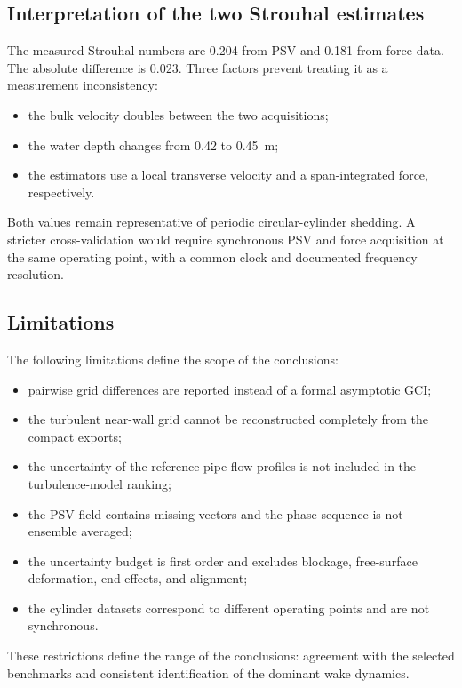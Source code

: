 \subsection{Interpretation of the two Strouhal estimates}

The measured Strouhal numbers are 0.204 from PSV and 0.181 from force data. The absolute difference is 0.023. Three factors prevent treating it as a measurement inconsistency:
\begin{itemize}
    \item the bulk velocity doubles between the two acquisitions;
    \item the water depth changes from 0.42 to 0.45~m;
    \item the estimators use a local transverse velocity and a span-integrated force, respectively.
\end{itemize}
Both values remain representative of periodic circular-cylinder shedding. A stricter cross-validation would require synchronous PSV and force acquisition at the same operating point, with a common clock and documented frequency resolution.

\subsection{Limitations}

The following limitations define the scope of the conclusions:
\begin{itemize}
    \item pairwise grid differences are reported instead of a formal asymptotic GCI;
    \item the turbulent near-wall grid cannot be reconstructed completely from the compact exports;
    \item the uncertainty of the reference pipe-flow profiles is not included in the turbulence-model ranking;
    \item the PSV field contains missing vectors and the phase sequence is not ensemble averaged;
    \item the uncertainty budget is first order and excludes blockage, free-surface deformation, end effects, and alignment;
    \item the cylinder datasets correspond to different operating points and are not synchronous.
\end{itemize}

These restrictions define the range of the conclusions: agreement with the selected benchmarks and consistent identification of the dominant wake dynamics.
